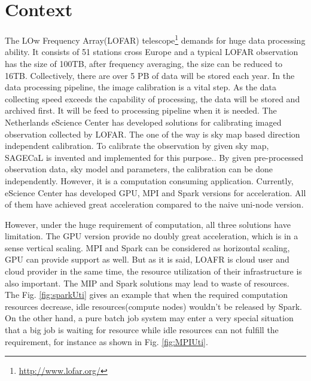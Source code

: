 \section{Context} 
The LOw Frequency Array(LOFAR) telescope\footnote{\url{http://www.lofar.org/}} demands for huge data processing ability. 
It consists of 51 stations cross Europe and a typical LOFAR observation has the size of 100TB, after frequency averaging, the size can be reduced to 16TB. \cite{Spreeuw2019}
Collectively, there are over 5 PB of data will be stored each year. \cite{Start2020} In the data processing pipeline, the image calibration is a vital step. 
As the data collecting speed exceeds the capability of processing, the data will be stored and archived first. It will be feed to processing pipeline when it is needed.
The Netherlands eScience Center has developed solutions for calibrating imaged observation collected by LOFAR. The one of the way is sky map based direction independent calibration.
To calibrate the observation by given sky map, SAGECaL is invented and implemented for this purpose.\cite{Kazemi2011}. 
By given pre-processed observation data, sky model and parameters, the calibration can be done independently. 
However, it is a computation consuming application. Currently, eScience Center has developed GPU, MPI and Spark versions for acceleration.
All of them have achieved great acceleration compared to the naive uni-node version. 

However, under the huge requirement of computation, all three solutions have limitation. The GPU version provide no doubly great acceleration, which is in a sense vertical scaling.
MPI and Spark can be considered as horizontal scaling, GPU can provide support as well. But as it is said, LOAFR is cloud user and cloud provider in the same time, the resource utilization of their infrastructure is also important.
The MIP and Spark solutions may lead to waste of resources. The Fig. \ref{fig:sparkUti} gives an example that when the required computation resources decrease, idle resources(compute nodes) wouldn't be released by Spark.
On the other hand, a pure batch job system may enter a very special situation that a big job is waiting for resource while idle resources can not fulfill the requirement, for instance as shown in Fig. \ref{fig:MPIUti}.



